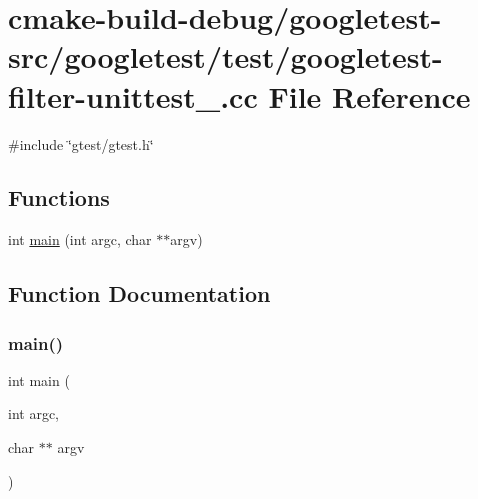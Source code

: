 \hypertarget{googletest-filter-unittest___8cc}{}\section{cmake-\/build-\/debug/googletest-\/src/googletest/test/googletest-\/filter-\/unittest\+\_\+.cc File Reference}
\label{googletest-filter-unittest___8cc}
{\ttfamily \#include \char`\"{}gtest/gtest.\+h\char`\"{}}\newline
\subsection*{Functions}
\begin{DoxyCompactItemize}
\item 
int \mbox{\hyperlink{googletest-filter-unittest___8cc_a3c04138a5bfe5d72780bb7e82a18e627}{main}} (int argc, char $\ast$$\ast$argv)
\end{DoxyCompactItemize}


\subsection{Function Documentation}
\mbox{\label{googletest-filter-unittest___8cc_a3c04138a5bfe5d72780bb7e82a18e627}} 
\subsubsection{\texorpdfstring{main()}{main()}}
{\footnotesize\ttfamily int main (\begin{DoxyParamCaption}\item[{int}]{argc,  }\item[{char $\ast$$\ast$}]{argv }\end{DoxyParamCaption})}

